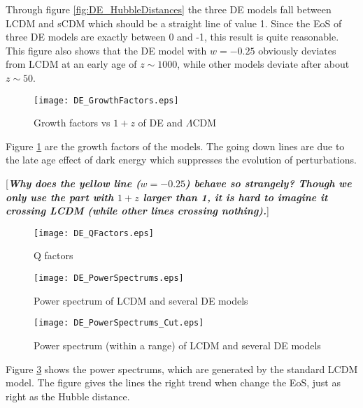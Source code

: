 \documentclass{article}
\begin{document}
Through figure \ref{fig:DE_HubbleDistances} the three DE models fall between LCDM and sCDM which should be a straight line of value 1. Since the EoS of three DE models are exactly between 0 and -1, this result is quite reasonable. This figure also shows that the DE model with $w=-0.25$ obviously deviates from LCDM at an early age of $z\sim 1000$, while other models deviate after about $z\sim 50$.






\begin{figure}[!htbp]
\centering
\texttt{[image: DE\_GrowthFactors.eps]} 
\caption{Growth factors vs $1+z$ of DE and $\Lambda$CDM}\label{fig:DE_GrowthFactors}
\end{figure}


Figure \ref{fig:DE_GrowthFactors} are the growth factors of the models. The going down lines are due to the late age effect of dark energy which suppresses the evolution of perturbations.

[{\color{red}\bf \it Why does the yellow line ($w=-0.25$) behave so strangely? Though we only use the part with $1+z$ larger than 1, it is hard to imagine it crossing LCDM (while other lines crossing nothing).}]






\begin{figure}[!htbp]
\centering
\texttt{[image: DE\_QFactors.eps]} 
\caption{Q factors}\label{fig:DE_QFactors}
\end{figure}



\begin{figure}[!htbp]
\centering
\texttt{[image: DE\_PowerSpectrums.eps]}
\caption{Power spectrum of LCDM and several DE models}\label{fig:DE_PowerSpectrums}
\end{figure}

\begin{figure}[!htbp]
\centering
\texttt{[image: DE\_PowerSpectrums\_Cut.eps]}
\caption{Power spectrum (within a range) of LCDM and several DE models}\label{fig:DE_PowerSpectrums_Cut}
\end{figure}



Figure \ref{fig:DE_PowerSpectrums} shows the power spectrums, which are generated by the standard LCDM model. The figure gives the lines the right trend when change the EoS, just as right as the Hubble distance.
\end{document}
